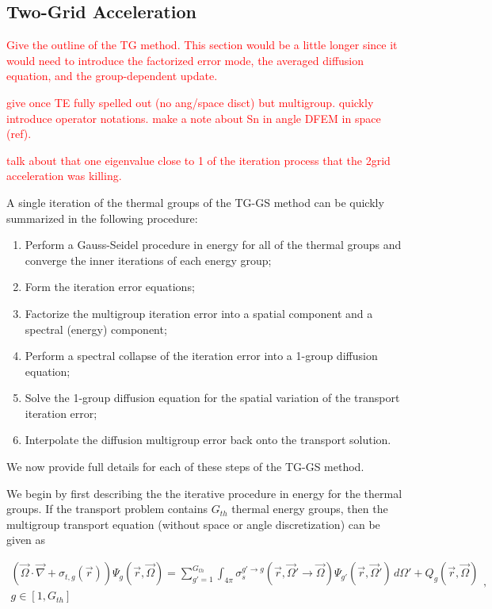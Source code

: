 \documentclass[preprint,10pt]{elsarticle}
\newcommand{\tcr}[1]{\textcolor{red}{#1}}
\begin{document}
\subsection{Two-Grid Acceleration}

\tcr{Give the outline of the TG method. This section would be a little longer since it would need to introduce the factorized error mode, the averaged diffusion equation, and the group-dependent update.}

\tcr{give once TE fully spelled out (no ang/space disct) but multigroup. quickly introduce operator notations. make a note about Sn in angle DFEM in space (ref).}

\tcr{talk about that one eigenvalue close to 1 of the iteration process that the 2grid acceleration was killing.}

A single iteration of the thermal groups of the TG-GS method can be quickly summarized in the following procedure:

\begin{enumerate}
\item Perform a Gauss-Seidel procedure in energy for all of the thermal groups and converge the inner iterations of each energy group;
\item Form the iteration error equations;
\item Factorize the multigroup iteration error into a spatial component and a spectral (energy) component;
\item Perform a spectral collapse of the iteration error into a 1-group diffusion equation;
\item Solve the 1-group diffusion equation for the spatial variation of the transport iteration error;
\item Interpolate the diffusion multigroup error back onto the transport solution.
\end{enumerate}

\noindent We now provide full details for each of these steps of the TG-GS method.

We begin by first describing the the iterative procedure in energy for the thermal groups. If the transport problem contains $G_{th}$ thermal energy groups, then the multigroup transport equation (without space or angle discretization) can be given as

\begin{equation}
\label{eq::MG_trans_eq}
\begin{aligned}
 \left( \vec{\Omega} \cdot \vec{\nabla}+ \sigma_{t,g} (\vec{r}) \right)  \Psi_g (\vec{r}, \vec{\Omega}) =  \sum_{g'=1}^{G_{th}}   \int_{4 \pi} \sigma_{s}^{g' \rightarrow g} ( \vec{r},\vec{\Omega}' \rightarrow \vec{\Omega} ) \Psi_{g'} (\vec{r},\vec{\Omega}')  \, d\Omega'   + Q_g (\vec{r}, \vec{\Omega})  \\
  g \in [1,G_{th}]
  \end{aligned} ,
\end{equation}
\end{document}
